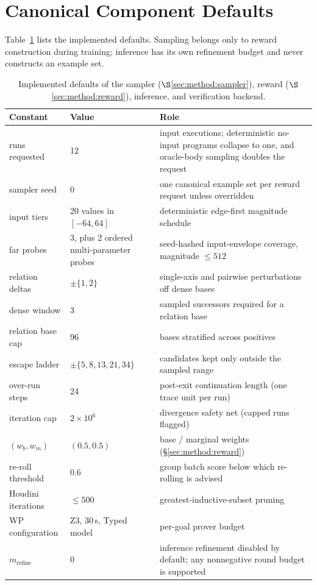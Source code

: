 
\section{Canonical Component Defaults}
\label{app:constants}

Table~\ref{tab:constants} lists the implemented defaults.  Sampling belongs only to reward construction during training; inference has its own refinement budget and never constructs an example set.

\begin{table}[h]
\centering
\small
\begin{tabular}{lp{3.2cm}p{6.2cm}}
\toprule
\textbf{Constant} & \textbf{Value} & \textbf{Role} \\
\midrule
runs requested & 12 & input executions; deterministic no-input programs collapse to one, and oracle-body sampling doubles the request \\
sampler seed & 0 & one canonical example set per reward request unless overridden \\
input tiers & 20 values in $[-64, 64]$ & deterministic edge-first magnitude schedule \\
far probes & 3, plus 2 ordered multi-parameter probes & seed-hashed input-envelope coverage, magnitude $\le 512$ \\
relation deltas & $\pm\{1,2\}$ & single-axis and pairwise perturbations off dense bases \\
dense window & 3 & sampled successors required for a relation base \\
relation base cap & 96 & bases stratified across positives \\
escape ladder & $\pm\{5,8,13,21,34\}$ & candidates kept only outside the sampled range \\
over-run steps & 24 & post-exit continuation length (one trace unit per run) \\
iteration cap & $2 \times 10^6$ & divergence safety net (capped runs flagged) \\
\midrule
$(w_b, w_m)$ & $(0.5, 0.5)$ & base / marginal weights (\S\ref{sec:method:reward}) \\
re-roll threshold & 0.6 & group batch score below which re-rolling is advised \\
\midrule
Houdini iterations & $\le 500$ & greatest-inductive-subset pruning \\
WP configuration & Z3, 30\,s, Typed model & per-goal prover budget \\
$m_{\mathrm{refine}}$ & 0 & inference refinement disabled by default; any nonnegative round budget is supported \\
\bottomrule
\end{tabular}
\caption{Implemented defaults of the sampler ($\S$\ref{sec:method:sampler}), reward ($\S$\ref{sec:method:reward}), inference, and verification backend.}
\label{tab:constants}
\end{table}

